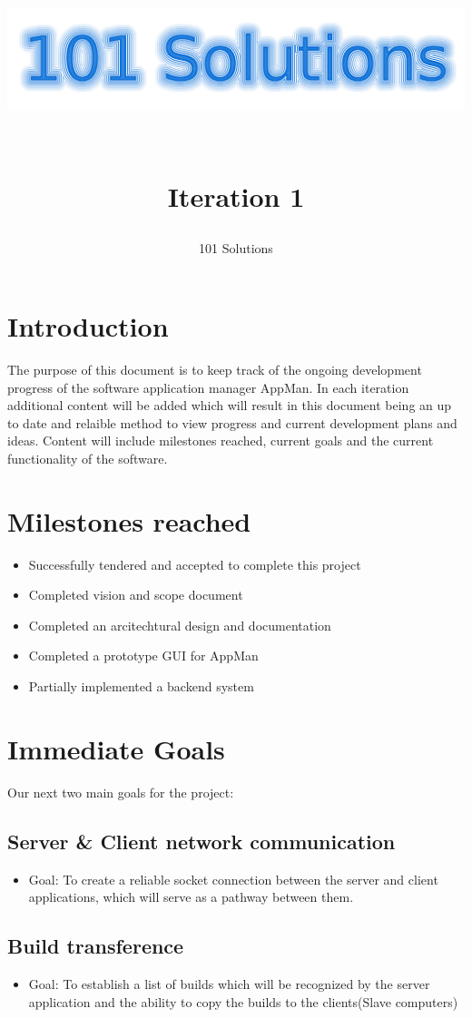 \documentclass[a4paper,12pt,final]{article}
\title{
\begin{center}
  	\includegraphics[scale=0.3]{Logo.png} 
  \end{center}
  \textbf{\\}
Iteration 1\\
}
\author{101 Solutions}
\begin{document}
\maketitle
\thispagestyle{empty}
\newpage
\tableofcontents
\thispagestyle{empty}
\newpage
{}

\section{Introduction}
The purpose of this document is to keep track of the ongoing development progress of the software application manager AppMan.  In each iteration additional content will be added which will result in this document being an up to date and relaible method to view progress and current development plans and ideas. Content will include milestones reached, current goals and the current functionality of the software.

\section{Milestones reached}
\begin{itemize}
\item Successfully tendered and accepted to complete this project
\item Completed vision and scope document
\item Completed an arcitechtural design and documentation
\item Completed a prototype GUI for AppMan
\item Partially implemented a backend system
\end{itemize}


\section{Immediate Goals}
Our next two main goals for the project:
\subsection{Server \& Client network communication}
\begin{itemize}
\item Goal: To create a reliable socket connection between the server and client applications, which will serve as a pathway between them.
\end{itemize}
\subsection{Build transference}
\begin{itemize}
\item Goal: To establish a list of builds which will be recognized by the server application and the ability to copy the builds to the clients(Slave computers)
\end{itemize}
\end{document}
